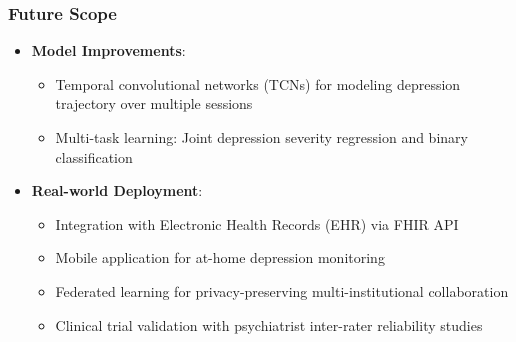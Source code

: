 \documentclass{beamer}
\begin{document}
\begin{frame}
\frametitle{Future Scope}
\begin{itemize}
    \item \textbf{Model Improvements}:
    \begin{itemize}
        
        \item Temporal convolutional networks (TCNs) for modeling depression trajectory over multiple sessions
        \item Multi-task learning: Joint depression severity regression and binary classification
    \end{itemize}
   
    \item \textbf{Real-world Deployment}:
    \begin{itemize}
        \item Integration with Electronic Health Records (EHR) via FHIR API
        \item Mobile application for at-home depression monitoring
        \item Federated learning for privacy-preserving multi-institutional collaboration
        \item Clinical trial validation with psychiatrist inter-rater reliability studies
    \end{itemize}
\end{itemize}
\end{frame}
\end{document}
